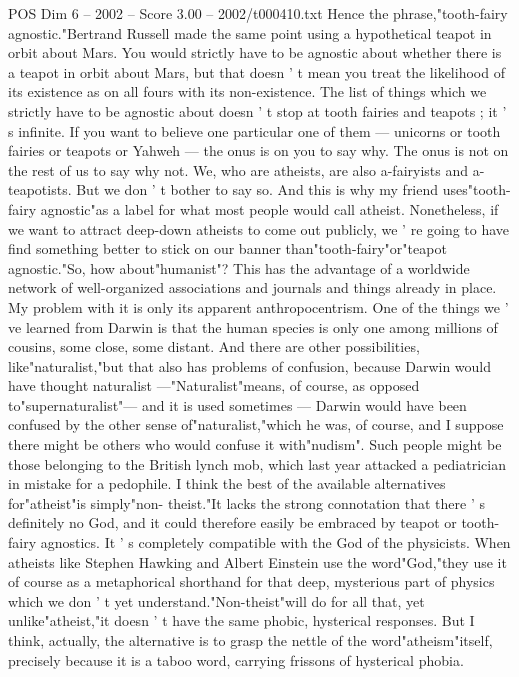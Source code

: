 \begin{textsample}{POS Dim 6 – 2002 – Score 3.00 – 2002/t000410.txt}
Hence the phrase,"tooth-fairy agnostic."Bertrand Russell made the same point using a hypothetical teapot in orbit about Mars.
You would strictly have to be agnostic about whether there is a teapot in orbit about Mars, but that doesn ' t mean you treat the likelihood of its existence as on all fours with its non-existence.
The list of things which we strictly have to be agnostic about doesn ' t stop at tooth fairies and teapots ; it ' s infinite.
If you want to believe one particular one of them — unicorns or tooth fairies or teapots or Yahweh — the onus is on you to say why.
The onus is not on the rest of us to say why not.
We, who are atheists, are also a-fairyists and a-teapotists.
But we don ' t bother to say so.
And this is why my friend uses"tooth-fairy agnostic"as a label for what most people would call atheist.
Nonetheless, if we want to attract deep-down atheists to come out publicly, we ' re going to have find something better to stick on our banner than"tooth-fairy"or"teapot agnostic."So, how about"humanist"?
This has the advantage of a worldwide network of well-organized associations and journals and things already in place.
My problem with it is only its apparent anthropocentrism.
One of the things we ' ve learned from Darwin is that the human species is only one among millions of cousins, some close, some distant.
And there are other possibilities, like"naturalist,"but that also has problems of confusion, because Darwin would have thought naturalist —"Naturalist"means, of course, as opposed to"supernaturalist"— and it is used sometimes — Darwin would have been confused by the other sense of"naturalist,"which he was, of course, and I suppose there might be others who would confuse it with"nudism".
Such people might be those belonging to the British lynch mob, which last year attacked a pediatrician in mistake for a pedophile.
I think the best of the available alternatives for"atheist"is simply"non- theist."It lacks the strong connotation that there ' s definitely no God, and it could therefore easily be embraced by teapot or tooth-fairy agnostics.
It ' s completely compatible with the God of the physicists.
When atheists like Stephen Hawking and Albert Einstein use the word"God,"they use it of course as a metaphorical shorthand for that deep, mysterious part of physics which we don ' t yet understand."Non-theist"will do for all that, yet unlike"atheist,"it doesn ' t have the same phobic, hysterical responses.
But I think, actually, the alternative is to grasp the nettle of the word"atheism"itself, precisely because it is a taboo word, carrying frissons of hysterical phobia.

\end{textsample}
